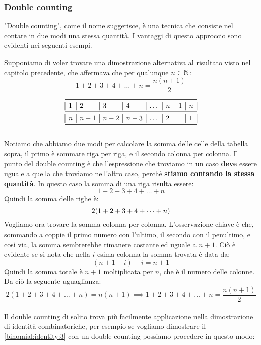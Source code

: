 \documentclass[11pt]{scrartcl}
\begin{document}
	\subsubsection{Double counting}
	"Double counting", come il nome suggerisce, è una tecnica che consiste nel contare in due modi una stessa quantità. I vantaggi di questo approccio sono evidenti nei seguenti esempi.
	
	\begin{example}
		Supponiamo di voler trovare una dimostrazione alternativa al risultato visto nel capitolo precedente, che affermava che per qualunque $n\in\mathbb N$:
		$$1+2+3+4+\dots+n=\frac{n(n+1)}{2}$$
	\end{example}
	\[
	\begin{array}{|l|l|l|l|l|l|l|}
		\toprule
		1 & 2 & 3 & 4 & \dots & n-1 & n\\
		\midrule
		n & n-1 & n-2 & n-3 & \dots & 2 & 1 \\
		\bottomrule
	\end{array}
	\]
	\\
	Notiamo che abbiamo due modi per calcolare la somma delle celle della tabella sopra, il primo è sommare riga per riga, e il secondo colonna per colonna. Il punto del double counting è che l'espressione che troviamo in un caso \textbf{deve} essere uguale a quella che troviamo nell'altro caso, perché \textbf{stiamo contando la stessa quantità}. In questo caso la somma di una riga risulta essere:
	$$1+2+3+4+\dots+n$$
	Quindi la somma delle righe è:
	\begin{equation}\notag
		\label{double:1}
		2(1+2+3+4+\dots+n)
	\end{equation}
	Vogliamo ora trovare la somma colonna per colonna. L'osservazione chiave è che, sommando a coppie il primo numero con l'ultimo, il secondo con il penultimo, e così via, la somma sembrerebbe rimanere costante ed uguale a $n+1$.
	Ciò è evidente se si nota che nella $i$-esima colonna la somma trovata è data da:
	$$(n+1-i)+i=n+1$$
	Quindi la somma totale è $n+1$ moltiplicata per $n$, che è il numero delle colonne.
	Da ciò la seguente uguaglianza:$$2(1+2+3+4+\dots+n)=n(n+1) \implies
	1+2+3+4+\dots+n=\frac{n(n+1)}{2}$$ 
	\\
	Il double counting di solito trova più facilmente applicazione nella dimostrazione di identità combinatoriche, per esempio se vogliamo dimostrare il \cref{binomial:identity:3} con un double counting possiamo procedere in questo modo:
\end{document}
